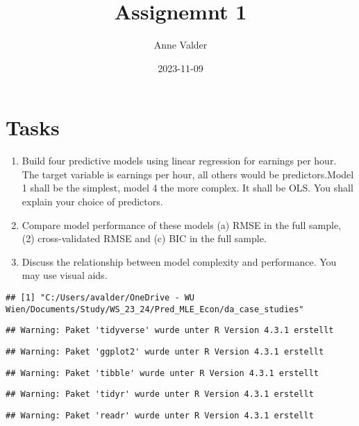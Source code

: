 \documentclass[
]{article}
\title{Assignemnt 1}
\author{Anne Valder}
\date{2023-11-09}
\begin{document}
\maketitle

\hypertarget{tasks}{%
\section{Tasks}\label{tasks}}

\begin{enumerate}
\def\labelenumi{\arabic{enumi}.}
\item
  Build four predictive models using linear regression for earnings per
  hour. The target variable is earnings per hour, all others would be
  predictors.Model 1 shall be the simplest, model 4 the more complex. It
  shall be OLS. You shall explain your choice of predictors.
\item
  Compare model performance of these models (a) RMSE in the full sample,
  (2) cross-validated RMSE and (c) BIC in the full sample.
\item
  Discuss the relationship between model complexity and performance. You
  may use visual aids.
\end{enumerate}

\begin{verbatim}
## [1] "C:/Users/avalder/OneDrive - WU Wien/Documents/Study/WS_23_24/Pred_MLE_Econ/da_case_studies"
\end{verbatim}

\begin{verbatim}
## Warning: Paket 'tidyverse' wurde unter R Version 4.3.1 erstellt
\end{verbatim}

\begin{verbatim}
## Warning: Paket 'ggplot2' wurde unter R Version 4.3.1 erstellt
\end{verbatim}

\begin{verbatim}
## Warning: Paket 'tibble' wurde unter R Version 4.3.1 erstellt
\end{verbatim}

\begin{verbatim}
## Warning: Paket 'tidyr' wurde unter R Version 4.3.1 erstellt
\end{verbatim}

\begin{verbatim}
## Warning: Paket 'readr' wurde unter R Version 4.3.1 erstellt
\end{verbatim}
\end{document}
